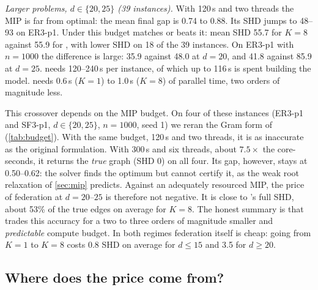 \emph{Larger problems, $d\in\{20,25\}$ (39 instances).} With 120\,s and two threads the MIP
is far from optimal: the mean final gap is 0.74 to 0.88. Its SHD jumps to 48--93 on ER3-p1.
Under this budget \feddbn{} matches or beats it: mean SHD 55.7 for $K=8$ against 55.9 for
\exdbn{}, with lower SHD on 18 of the 39 instances. On ER3-p1 with $n=1000$ the difference
is large: 35.9 against 48.0 at $d=20$, and 41.8 against 85.9 at $d=25$. \exdbn{} needs
120--240\,s per instance, of which up to 116\,s is spent building the model. \feddbn{} needs
0.6\,s ($K=1$) to 1.0\,s ($K=8$) of parallel time, two orders of magnitude less.

This crossover depends on the MIP budget. On four of these instances (ER3-p1 and SF3-p1,
$d\in\{20,25\}$, $n=1000$, seed 1) we reran the Gram form of \exdbn{}
(\cref{tab:budget}). With the same budget, 120\,s and two threads, it is as inaccurate as
the original formulation. With 300\,s and six threads, about $7.5\times$ the core-seconds,
it returns the \emph{true} graph (SHD 0) on all four. Its gap, however, stays at 0.50--0.62:
the solver finds the optimum but cannot certify it, as the weak root relaxation of
\cref{sec:mip} predicts. Against an adequately resourced MIP, the price of federation at
$d=20$--$25$ is therefore not negative. It is close to \feddbn's full SHD, about 53\% of the
true edges on average for $K=8$. The honest summary is that \feddbn{} trades this accuracy for a two to three
orders of magnitude smaller and \emph{predictable} compute budget. In both regimes
federation itself is cheap: going from $K=1$ to $K=8$ costs 0.8 SHD on average for $d\le15$
and 3.5 for $d\ge 20$.

\begin{table}[t]
\centering
\caption{Sensitivity of \exdbn{} to its compute budget on four instances with $n=1000$,
seed 1. Original formulation from \cref{tab:main}; Gram form of \cref{prop:gram}.}
\label{tab:budget}
\small

\end{table}

\subsection{Where does the price come from?}
\label{sec:exp-decomp}

\begin{table}[t]
\centering
\caption{Decomposition \eqref{eq:decomp} of the price of federation with $K=8$ clients,
averaged over the instances of each row. A negative $\Delta_{\mathrm{est}}$ means that least
squares with the true order beats the time-limited MIP.}
\label{tab:decomp}
\small

\end{table}


